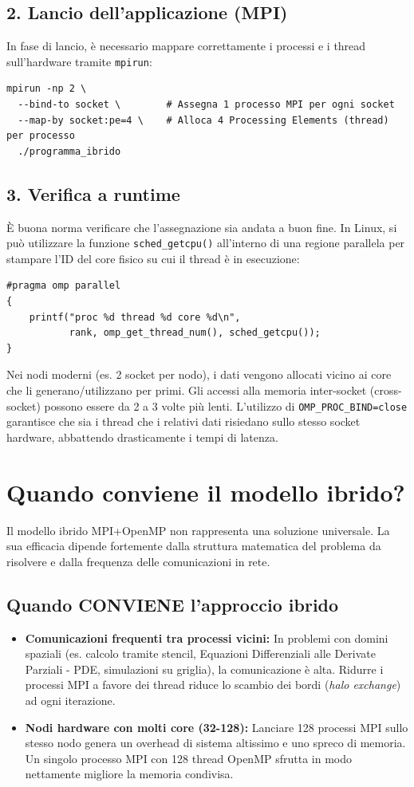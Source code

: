 \subsection*{2. Lancio dell'applicazione (MPI)}
In fase di lancio, è necessario mappare correttamente i processi e i thread sull'hardware tramite \texttt{mpirun}:
\begin{verbatim}
mpirun -np 2 \
  --bind-to socket \        # Assegna 1 processo MPI per ogni socket
  --map-by socket:pe=4 \    # Alloca 4 Processing Elements (thread) per processo
  ./programma_ibrido
\end{verbatim}

\subsection*{3. Verifica a runtime}
È buona norma verificare che l'assegnazione sia andata a buon fine. In Linux, si può utilizzare la funzione \texttt{sched\_getcpu()} all'interno di una regione parallela per stampare l'ID del core fisico su cui il thread è in esecuzione:
\begin{verbatim}
#pragma omp parallel
{
    printf("proc %d thread %d core %d\n",
           rank, omp_get_thread_num(), sched_getcpu());
}
\end{verbatim}

Nei nodi moderni (es. 2 socket per nodo), i dati vengono allocati vicino ai core che li generano/utilizzano per primi. Gli accessi alla memoria inter-socket (cross-socket) possono essere da 2 a 3 volte più lenti. L'utilizzo di \texttt{OMP\_PROC\_BIND=close} garantisce che sia i thread che i relativi dati risiedano sullo stesso socket hardware, abbattendo drasticamente i tempi di latenza.

\section*{Quando conviene il modello ibrido?}

Il modello ibrido MPI+OpenMP non rappresenta una soluzione universale. La sua efficacia dipende fortemente dalla struttura matematica del problema da risolvere e dalla frequenza delle comunicazioni in rete.

\subsection*{Quando CONVIENE l'approccio ibrido}
\begin{itemize}
    \item \textbf{Comunicazioni frequenti tra processi vicini:} In problemi con domini spaziali (es. calcolo tramite stencil, Equazioni Differenziali alle Derivate Parziali - PDE, simulazioni su griglia), la comunicazione è alta. Ridurre i processi MPI a favore dei thread riduce lo scambio dei bordi (\textit{halo exchange}) ad ogni iterazione.
    \item \textbf{Nodi hardware con molti core (32-128):} Lanciare 128 processi MPI sullo stesso nodo genera un overhead di sistema altissimo e uno spreco di memoria. Un singolo processo MPI con 128 thread OpenMP sfrutta in modo nettamente migliore la memoria condivisa.
\end{itemize}


